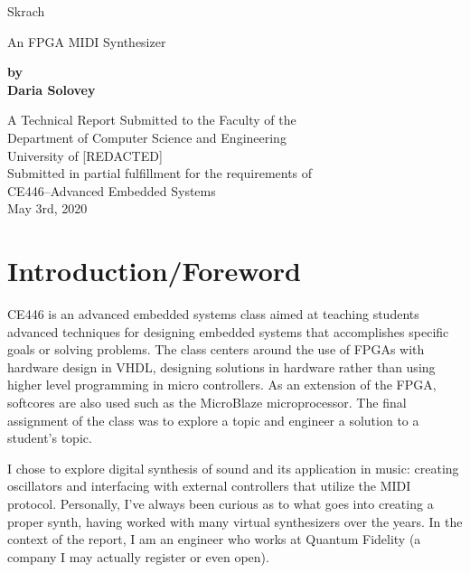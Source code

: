 \documentclass[12pt]{article}
\begin{document}
\begin{titlepage}
    \begin{center}
        \vspace*{1cm}
 
        {\fontsize{60}{75}\atnight Skrach}
 
        \vspace{0.5cm}
        \Large
        An FPGA MIDI Synthesizer
 
        \vspace{3cm}
 
        \textbf{by\\Daria Solovey}
 
        \vfill
        
        \Large
        A Technical Report Submitted to the Faculty of the\\
        Department of Computer Science and Engineering\\
        University of [REDACTED]\\
        
        \vspace{1cm}
        Submitted in partial fulfillment for the requirements of\\
        CE446--Advanced Embedded Systems\\
        May 3rd, 2020
 
    \end{center}
\end{titlepage}

\tableofcontents

\newpage

\section{Introduction/Foreword}
CE446 is an advanced embedded systems class aimed at teaching students advanced techniques for designing embedded systems that accomplishes specific goals or solving problems. The class centers around the use of FPGAs with hardware design in VHDL, designing solutions in hardware rather than using higher level programming in micro controllers. As an extension of the FPGA, softcores are also used such as the MicroBlaze microprocessor. The final assignment of the class was to explore a topic and engineer a solution to a student's topic.

I chose to explore digital synthesis of sound and its application in music: creating oscillators and interfacing with external controllers that utilize the MIDI protocol. Personally, I've always been curious as to what goes into creating a proper synth, having worked with many virtual synthesizers over the years. In the context of the report, I am an engineer who works at Quantum Fidelity (a company I may actually register or even open).
\end{document}
